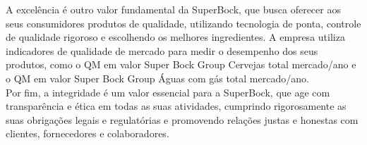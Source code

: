A excelência é outro valor fundamental da SuperBock, que busca oferecer aos seus consumidores produtos de qualidade, utilizando tecnologia de ponta, controle de qualidade rigoroso e escolhendo os melhores ingredientes\cite{ref5}. A empresa utiliza indicadores de qualidade de mercado para medir o desempenho dos seus produtos, como o QM em valor Super Bock Group Cervejas total mercado/ano e o QM em valor Super Bock Group Águas com gás total mercado/ano\cite{ref4}.\\

Por fim, a integridade é um valor essencial para a SuperBock, que age com transparência e ética em todas as suas atividades, cumprindo rigorosamente as suas obrigações legais e regulatórias e promovendo relações justas e honestas com clientes, fornecedores e colaboradores\cite{ref4}.\\

